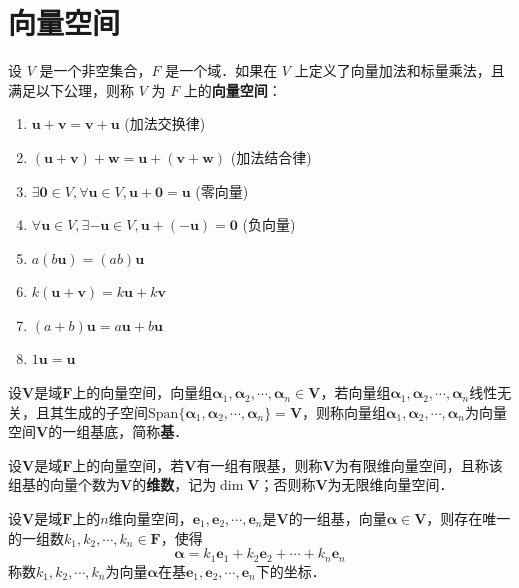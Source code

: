 \documentclass[12pt, a4paper, oneside, UTF8]{ctexbook}
\begin{document}
\section{向量空间}
\begin{definition}[向量空间]
设 $V$ 是一个非空集合，$F$ 是一个域．如果在 $V$ 上定义了向量加法和标量乘法，且满足以下公理，则称 $V$ 为 $F$ 上的\textbf{向量空间}：
\begin{enumerate}
    \item $\bm{u} + \bm{v} = \bm{v} + \bm{u}$ (加法交换律)
    \item $(\bm{u} + \bm{v}) + \bm{w} = \bm{u} + (\bm{v} + \bm{w})$ (加法结合律)
    \item $\exists \bm{0} \in V, \forall \bm{u} \in V, \bm{u} + \bm{0} = \bm{u}$ (零向量)
    \item $\forall \bm{u} \in V, \exists -\bm{u} \in V, \bm{u} + (-\bm{u}) = \bm{0}$ (负向量)
    \item $a(b\bm{u}) = (ab)\bm{u}$
    \item $k(\bm{u} + \bm{v}) = k\bm{u} + k\bm{v}$
    \item $(a+b)\bm{u} = a\bm{u} + b\bm{u}$
    \item $1\bm{u} = \bm{u}$
\end{enumerate}
\end{definition}
\begin{definition}
    设$\bm{V}$是域$\bm{F}$上的向量空间，向量组$\bm{\alpha}_1, \bm{\alpha}_2, \cdots, \bm{\alpha}_n \in \bm{V}$，若向量组$\bm{\alpha}_1, \bm{\alpha}_2, \cdots, \bm{\alpha}_n$线性无关，且其生成的子空间$\mathrm{Span}\{\bm{\alpha}_1, \bm{\alpha}_2, \cdots, \bm{\alpha}_n\}=\bm{V}$，则称向量组$\bm{\alpha}_1, \bm{\alpha}_2, \cdots, \bm{\alpha}_n$为向量空间$\bm{V}$的一组基底，简称\textbf{基}．
\end{definition}
\begin{definition}
    设$\bm{V}$是域$\bm{F}$上的向量空间，若$\bm{V}$有一组有限基，则称$\bm{V}$为有限维向量空间，且称该组基的向量个数为$\bm{V}$的\textbf{维数}，记为$\operatorname{dim}\bm{V}$；否则称$\bm{V}$为无限维向量空间．
\end{definition}
\begin{definition}
    设$\bm{V}$是域$\bm{F}$上的$n$维向量空间，$\bm{e}_1, \bm{e}_2, \cdots, \bm{e}_n$是$\bm{V}$的一组基，向量$\bm{\alpha} \in \bm{V}$，则存在唯一的一组数$k_1, k_2, \cdots, k_n \in \bm{F}$，使得
    \[
        \bm{\alpha} = k_1\bm{e}_1 + k_2\bm{e}_2 + \cdots + k_n\bm{e}_n
    \]
    称数$k_1, k_2, \cdots, k_n$为向量$\bm{\alpha}$在基$\bm{e}_1, \bm{e}_2, \cdots, \bm{e}_n$下的坐标．
\end{definition}
\end{document}

